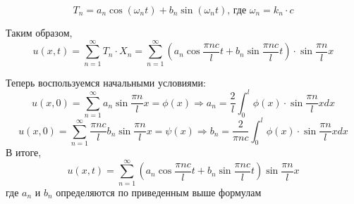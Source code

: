 \[ 
	T_n = a_n\cos(\omega_n t) + b_n\sin(\omega_n t) \text{, где } 
	\omega_n = k_n\cdot c
\]

Таким образом, 
\[ 
	u(x, t) = \sum_{n=1}^{\infty}T_n\cdot X_n = \sum_{n=1}^{\infty}
	\left( a_n\cos\frac{\pi nc}{l}t + b_n\sin\frac{\pi nc}{l}t \right)
	\cdot\sin\frac{\pi n}{l}x
\]

Теперь воспользуемся начальными условиями:
\[ 
	u(x, 0) = \sum_{n=1}^{\infty} a_n\sin\frac{\pi n}{l}x = \phi(x) 
	\Rightarrow a_n = \frac{2}{l} \int_0^l \phi(x)\cdot\sin\frac{\pi n}{l}xdx
\]
\[ 
	u(x, 0) = \sum_{n=1}^{\infty} \frac{\pi nc}{l} b_n\sin\frac{\pi n}{l}x = 
	\psi(x) \Rightarrow b_n = \frac{2}{\pi nc} 
	\int_0^l \phi(x)\cdot\sin\frac{\pi n}{l}xdx
\]
В итоге, 
\[
	u(x, t) = \sum_{n=1}^{\infty}\left( a_n\cos\frac{\pi nc}{l}t + 
	b_n\sin\frac{\pi nc}{l}t \right)\sin\frac{\pi n}{l}x
\]
где \( a_n \) и \( b_n \) определяются по приведенным выше формулам

\newpage
